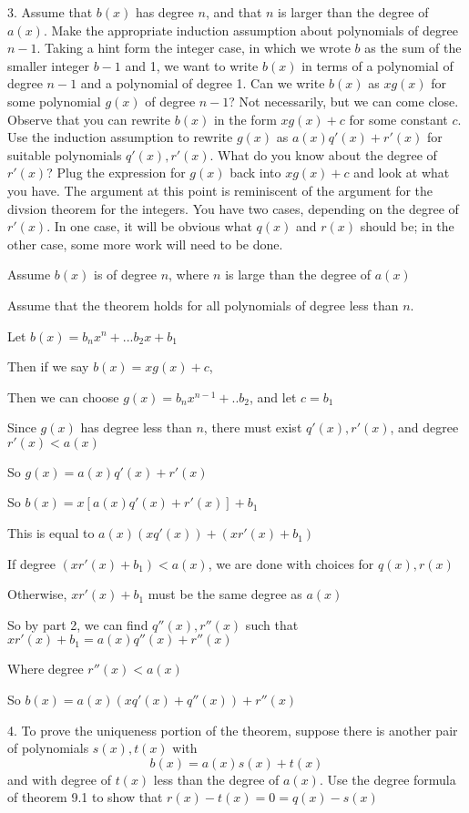 \documentclass[12pt]{article}
\begin{document}
\begin{itemize}
	3. Assume that $b(x)$ has degree $n$, and that $n$ is larger than the degree of $a(x)$.
	Make the appropriate induction assumption about polynomials of degree $n-1$.
	Taking a hint form the integer case, in which we wrote $b$ as the
	sum of the smaller integer $b-1$ and 1, we want to write $b(x)$
	in terms of a polynomial of degree $n-1$ and a polynomial of degree 1.
	Can we write $b(x)$ as $xg(x)$ for some polynomial $g(x)$ of degree $n-1$?
	Not necessarily, but we can come close. Observe that you can rewrite $b(x)$
	in the form $xg(x) + c$ for some constant $c$. Use the induction assumption
	to rewrite $g(x)$ as $a(x)q'(x) + r'(x)$ for suitable polynomials $q'(x), r'(x)$.
	What do you know about the degree of $r'(x)$? Plug the expression for $g(x)$ back
	into $xg(x) + c$ and look at what you have. The argument at this point is reminiscent
	of the argument for the divsion theorem for the integers. 
	You have two cases, depending on the degree of $r'(x)$.
	In one case, it will be obvious what $q(x)$ and $r(x)$ should be;
	in the other case, some more work will need to be done.

  Assume $b(x)$ is of degree $n$, where $n$ is large than the degree of $a(x)$
	
	Assume that the theorem holds for all polynomials of degree less than $n$.
	
	Let $b(x) = b_nx^{n} + ... b_2x + b_1$

	Then if we say $b(x) = xg(x) + c$,

	Then we can choose $g(x) = b_nx^{n-1} + .. b_2$, and let $c= b_1$

	Since $g(x)$ has degree less than $n$, there must exist $q'(x), r'(x)$, and degree $r'(x) < a(x)$

	So $g(x) = a(x)q'(x) + r'(x)$

	So $b(x) = x[a(x)q'(x) + r'(x)] + b_1$

	This is equal to $a(x)(xq'(x)) + (xr'(x) + b_1)$

	If degree $(xr'(x) + b_1) < a(x)$, we are done with choices for $q(x), r(x)$
	
	Otherwise, $xr'(x) + b_1$ must be the same degree as $a(x)$

	So by part 2, we can find $q''(x), r''(x)$ such that $xr'(x) + b_1 = a(x)q''(x) + r''(x)$

	Where degree $r''(x) < a(x)$ 

	So $b(x) = a(x)(xq'(x) + q''(x)) + r''(x)$

	4. To prove the uniqueness portion of the theorem,
	suppose there is another pair of polynomials
	$s(x), t(x)$ with $$b(x) = a(x)s(x) + t(x)$$ 
	and with degree of $t(x)$ less than the degree of $a(x)$.
	Use the degree formula of theorem 9.1 
	to show that $r(x) - t(x) = 0 = q(x) - s(x)$


\end{itemize}
\end{document}
